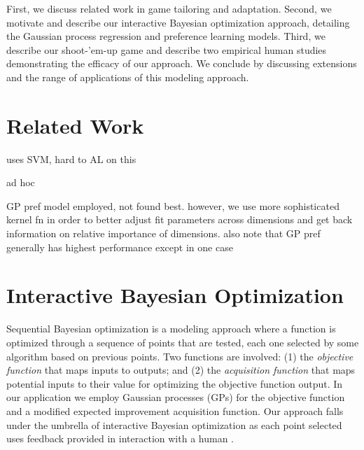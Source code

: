 \documentclass[letterpaper]{article}
\begin{document}

First, we discuss related work in game tailoring and adaptation. Second, we motivate and describe our interactive Bayesian optimization approach, detailing the Gaussian process regression and preference learning models. Third, we describe our shoot-'em-up game and describe two empirical human studies demonstrating the efficacy of our approach. We conclude by discussing extensions and the range of applications of this modeling approach.


\section{Related Work}

\cite{yu2011:minboredom} uses SVM, hard to AL on this

\cite{hunicke2004:dda} ad hoc

\cite{yannakakis2009:gameadapt} \cite{yannakakis2009:playermodel} GP pref model employed, not found best. however, we use more sophisticated kernel fn in order to better adjust fit parameters across dimensions and get back information on relative importance of dimensions. also note that GP pref generally has highest performance except in one case

\cite{bakkes2012}

\section{Interactive Bayesian Optimization}
Sequential Bayesian optimization is a modeling approach where a function is optimized through a sequence of points that are tested, each one selected by some algorithm based on previous points. Two functions are involved: (1) the \textit{objective function} that maps inputs to outputs; and (2) the \textit{acquisition function} that maps potential inputs to their value for optimizing the objective function output. In our application we employ Gaussian processes (GPs) for the objective function and a modified expected improvement acquisition function. Our approach falls under the umbrella of interactive Bayesian optimization as each point selected uses feedback provided in interaction with a human \cite{brochu2010:thesis}.
\end{document}
